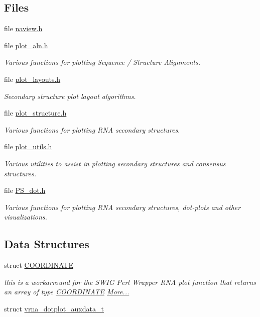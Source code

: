 \subsection*{Files}
\begin{DoxyCompactItemize}
\item 
file \hyperlink{naview_8h}{naview.\+h}
\item 
file \hyperlink{plot__aln_8h}{plot\+\_\+aln.\+h}
\begin{DoxyCompactList}\small\item\em Various functions for plotting Sequence / Structure Alignments. \end{DoxyCompactList}\item 
file \hyperlink{plot__layouts_8h}{plot\+\_\+layouts.\+h}
\begin{DoxyCompactList}\small\item\em Secondary structure plot layout algorithms. \end{DoxyCompactList}\item 
file \hyperlink{plot__structure_8h}{plot\+\_\+structure.\+h}
\begin{DoxyCompactList}\small\item\em Various functions for plotting R\+NA secondary structures. \end{DoxyCompactList}\item 
file \hyperlink{plot__utils_8h}{plot\+\_\+utils.\+h}
\begin{DoxyCompactList}\small\item\em Various utilities to assist in plotting secondary structures and consensus structures. \end{DoxyCompactList}\item 
file \hyperlink{PS__dot_8h}{P\+S\+\_\+dot.\+h}
\begin{DoxyCompactList}\small\item\em Various functions for plotting R\+NA secondary structures, dot-\/plots and other visualizations. \end{DoxyCompactList}\end{DoxyCompactItemize}
\subsection*{Data Structures}
\begin{DoxyCompactItemize}
\item 
struct \hyperlink{group__plotting__utils_structCOORDINATE}{C\+O\+O\+R\+D\+I\+N\+A\+TE}
\begin{DoxyCompactList}\small\item\em this is a workarround for the S\+W\+IG Perl Wrapper R\+NA plot function that returns an array of type \hyperlink{group__plotting__utils_structCOORDINATE}{C\+O\+O\+R\+D\+I\+N\+A\+TE}  \hyperlink{group__plotting__utils_structCOORDINATE}{More...}\end{DoxyCompactList}\item 
struct \hyperlink{group__plotting__utils_structvrna__dotplot__auxdata__t}{vrna\+\_\+dotplot\+\_\+auxdata\+\_\+t}
\end{DoxyCompactItemize}
